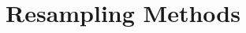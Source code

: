 \documentclass[caret-main.tex]{subfiles}
\begin{document}
\section{Resampling Methods}

\newpage
\end{document}
